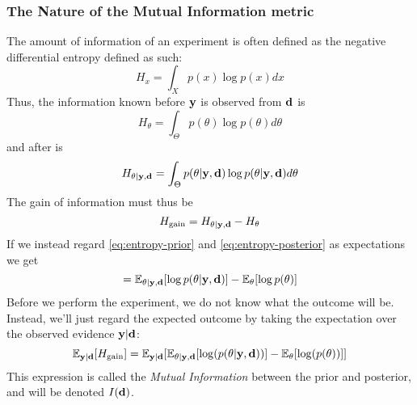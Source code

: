 \subsubsection{The Nature of the Mutual Information metric}
The amount of information of an experiment is often defined as the negative differential entropy defined as such\cite{lindley56}:
\begin{equation}H_x = \int_{X}p(x)\log p(x)dx\end{equation}
Thus, the information known before $\mathbf{y}$ is observed from $\mathbf{d}$ is
\begin{equation}\label{eq:entropy-prior}H_\theta = \int_{\Theta}p(\theta)\log p(\theta)d\theta\end{equation}
and after is
\begin{equation}\label{eq:entropy-posterior}H_{\theta | \mathbf{y}, \mathbf{d}} = \int_{\Theta}p(\theta| \mathbf{y}, \mathbf{d})\log p(\theta| \mathbf{y}, \mathbf{d})d\theta\end{equation}
The gain of information must thus be
\begin{equation}H_\textrm{gain} = H_{\theta | \mathbf{y}, \mathbf{d}} - H_\theta\end{equation}
If we instead regard \eqref{eq:entropy-prior} and \eqref{eq:entropy-posterior} as expectations we get
\begin{equation} = \mathbb{E}_{\theta | \mathbf{y}, \mathbf{d}}[\log p(\theta | \mathbf{y}, \mathbf{d})] - \mathbb{E}_\theta [\log p(\theta )]\end{equation}
Before we perform the experiment, we do not know what the outcome will be. Instead, we'll just regard the expected outcome by taking the expectation over the observed evidence $\mathbf{y} | \mathbf{d}$:
\begin{equation} \label{eq:mi-bad}\mathbb{E}_{\mathbf{y} | \mathbf{d}}[H_\textrm{gain}]  = \mathbb{E}_{\mathbf{y} | \mathbf{d}}[\mathbb{E}_{\theta | \mathbf{y}, \mathbf{d}} [\log(p(\theta | \mathbf{y}, \mathbf{d}))] - \mathbb{E}_{\theta}[\log(p(\theta))]]\end{equation}
This expression is called the \textit{Mutual Information} between the prior and posterior, and will be denoted $I(\mathbf{d})$.\\
